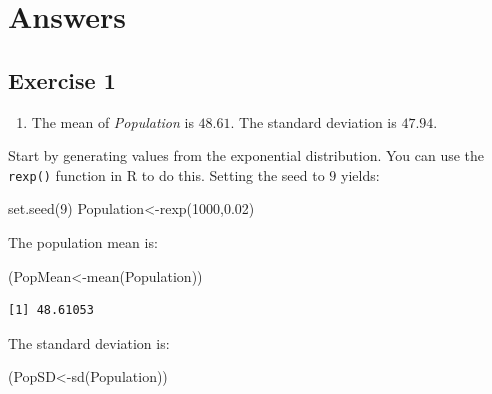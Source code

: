 \documentclass[
  letterpaper,
  DIV=11,
  numbers=noendperiod]{scrreprt}
\newenvironment{Shaded}{\begin{snugshade}}{\end{snugshade}}
\newcommand{\DecValTok}[1]{\textcolor[rgb]{0.68,0.00,0.00}{#1}}
\newcommand{\FloatTok}[1]{\textcolor[rgb]{0.68,0.00,0.00}{#1}}
\newcommand{\FunctionTok}[1]{\textcolor[rgb]{0.28,0.35,0.67}{#1}}
\newcommand{\NormalTok}[1]{\textcolor[rgb]{0.00,0.23,0.31}{#1}}
\newcommand{\OtherTok}[1]{\textcolor[rgb]{0.00,0.23,0.31}{#1}}
\providecommand{\tightlist}{%
  \setlength{\itemsep}{0pt}\setlength{\parskip}{0pt}}\usepackage{longtable,booktabs,array}
\begin{document}
\hypertarget{answers-11}{%
\section{Answers}\label{answers-11}}

\hypertarget{exercise-1-23}{%
\subsection*{Exercise 1}\label{exercise-1-23}}

\begin{blackbox}

\begin{enumerate}
\def\labelenumi{\arabic{enumi}.}
\tightlist
\item
  The mean of \emph{Population} is \(48.61\). The standard deviation is
  \(47.94\).
\end{enumerate}

\end{blackbox}

Start by generating values from the exponential distribution. You can
use the \texttt{rexp()} function in R to do this. Setting the seed to
\(9\) yields:

\begin{Shaded}
\begin{Highlighting}[numbers=left,,]
\FunctionTok{set.seed}\NormalTok{(}\DecValTok{9}\NormalTok{)}
\NormalTok{Population}\OtherTok{\textless{}{-}}\FunctionTok{rexp}\NormalTok{(}\DecValTok{1000}\NormalTok{,}\FloatTok{0.02}\NormalTok{)}
\end{Highlighting}
\end{Shaded}

The population mean is:

\begin{Shaded}
\begin{Highlighting}[numbers=left,,]
\NormalTok{(PopMean}\OtherTok{\textless{}{-}}\FunctionTok{mean}\NormalTok{(Population))}
\end{Highlighting}
\end{Shaded}

\begin{verbatim}
[1] 48.61053
\end{verbatim}

The standard deviation is:

\begin{Shaded}
\begin{Highlighting}[numbers=left,,]
\NormalTok{(PopSD}\OtherTok{\textless{}{-}}\FunctionTok{sd}\NormalTok{(Population))}
\end{Highlighting}
\end{Shaded}
\end{document}
